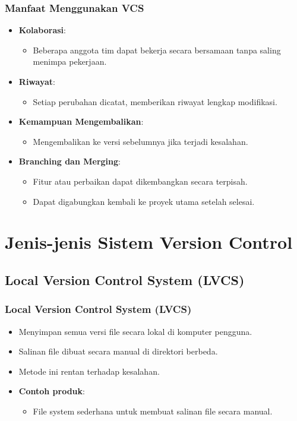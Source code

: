 \documentclass[aspectratio=169, table]{beamer}
\begin{document}
\begin{frame}[fragile]
\frametitle{Manfaat Menggunakan VCS}
\begin{itemize}
\item \textbf{Kolaborasi}: 
\begin{itemize}
	\item Beberapa anggota tim dapat bekerja secara bersamaan tanpa saling menimpa pekerjaan.
\end{itemize}
\item \textbf{Riwayat}: 
\begin{itemize}
	\item Setiap perubahan dicatat, memberikan riwayat lengkap modifikasi.
\end{itemize}
\item \textbf{Kemampuan Mengembalikan}: 
\begin{itemize}
	\item Mengembalikan ke versi sebelumnya jika terjadi kesalahan.
\end{itemize}
\item \textbf{Branching dan Merging}: 
\begin{itemize}
	\item Fitur atau perbaikan dapat dikembangkan secara terpisah.
	\item Dapat digabungkan kembali ke proyek utama setelah selesai.
\end{itemize}
\end{itemize}
\end{frame}

\section{Jenis-jenis Sistem Version Control}

\subsection{Local Version Control System (LVCS)}

\begin{frame}[fragile]
\frametitle{Local Version Control System (LVCS)}
\begin{itemize}
\item Menyimpan semua versi file secara lokal di komputer pengguna.
\item Salinan file dibuat secara manual di direktori berbeda.
\item Metode ini rentan terhadap kesalahan.
\item \textbf{Contoh produk}:
\begin{itemize}
	\item File system sederhana untuk membuat salinan file secara manual.
\end{itemize}
\end{itemize}
\end{frame}
\end{document}
